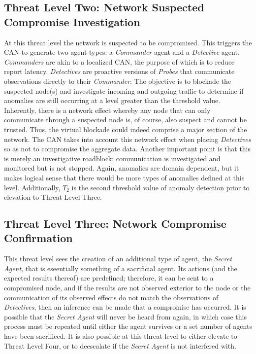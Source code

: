 \documentclass{acm_proc_article-sp}
\begin{document}
\subsection{Threat Level Two: Network Suspected Compromise Investigation}
At this threat level the network is suspected to be compromised.  This triggers the CAN to generate two agent types: a {\it Commander} agent and a {\it Detective} agent.  {\it Commanders} are akin to a localized CAN, the purpose of which is to reduce report latency.  {\it Detectives} are proactive versions of {\it Probes} that communicate observations directly to their {\it Commander}.  The objective is to blockade the suspected node(s) and investigate incoming and outgoing traffic to determine if anomalies are still occurring at a level greater than the threshold value.  Inherently, there is a network effect whereby any node that can only communicate through a suspected node is, of course, also suspect and cannot be trusted.  Thus, the virtual blockade could indeed comprise a major section of the network.  The CAN takes into account this network effect when placing {\it Detectives} so as not to compromise the aggregate data.  Another important point is that this is merely an investigative roadblock; communication is investigated and monitored but is not stopped.  Again, anomalies are domain dependent, but it makes logical sense that there would be more types of anomalies defined at this level.  Additionally, $T_2$ is the second threshold value of anomaly detection prior to elevation to Threat Level Three.

\subsection{Threat Level Three: Network Compromise Confirmation}
This threat level sees the creation of an additional type of agent, the {\it Secret Agent}, that is eseentially something of a sacrificial agent.  Its actions (and the expected results thereof) are predefined; therefore, it can be sent to a compromised node, and if the results are not observed exterior to the node or the communication of its observed effects do not match the observations of {\it Detectives}, then an inference can be made that a compromise has occurred.  It is possible that the {\it Secret Agent} will never be heard from again, in which case this process must be repeated until either the agent survives or a set number of agents have been sacrificed.  It is also possible at this threat level to either elevate to Threat Level Four, or to deescalate if the {\it Secret Agent} is not interfered with.
\end{document}
